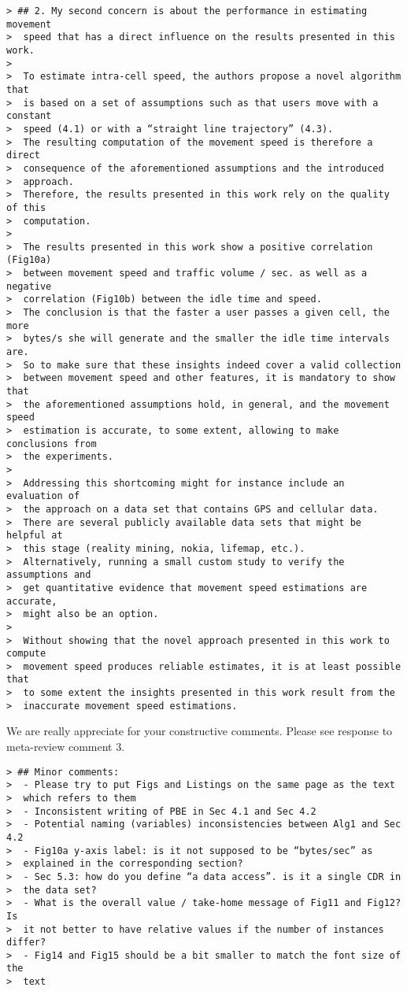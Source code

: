 \begin{verbatim}
> ## 2. My second concern is about the performance in estimating movement
>  speed that has a direct influence on the results presented in this work.
>
>  To estimate intra-cell speed, the authors propose a novel algorithm that
>  is based on a set of assumptions such as that users move with a constant
>  speed (4.1) or with a “straight line trajectory” (4.3).
>  The resulting computation of the movement speed is therefore a direct
>  consequence of the aforementioned assumptions and the introduced
>  approach.
>  Therefore, the results presented in this work rely on the quality of this
>  computation.
>
>  The results presented in this work show a positive correlation (Fig10a)
>  between movement speed and traffic volume / sec. as well as a negative
>  correlation (Fig10b) between the idle time and speed.
>  The conclusion is that the faster a user passes a given cell, the more
>  bytes/s she will generate and the smaller the idle time intervals are.
>  So to make sure that these insights indeed cover a valid collection
>  between movement speed and other features, it is mandatory to show that
>  the aforementioned assumptions hold, in general, and the movement speed
>  estimation is accurate, to some extent, allowing to make conclusions from
>  the experiments.
>
>  Addressing this shortcoming might for instance include an evaluation of
>  the approach on a data set that contains GPS and cellular data.
>  There are several publicly available data sets that might be helpful at
>  this stage (reality mining, nokia, lifemap, etc.).
>  Alternatively, running a small custom study to verify the assumptions and
>  get quantitative evidence that movement speed estimations are accurate,
>  might also be an option.
>
>  Without showing that the novel approach presented in this work to compute
>  movement speed produces reliable estimates, it is at least possible that
>  to some extent the insights presented in this work result from the
>  inaccurate movement speed estimations.
\end{verbatim}

We are really appreciate for your constructive comments.
Please see response to meta-review comment 3.

\begin{verbatim}
> ## Minor comments:
>  - Please try to put Figs and Listings on the same page as the text
>  which refers to them
>  - Inconsistent writing of PBE in Sec 4.1 and Sec 4.2
>  - Potential naming (variables) inconsistencies between Alg1 and Sec 4.2
>  - Fig10a y-axis label: is it not supposed to be “bytes/sec” as
>  explained in the corresponding section?
>  - Sec 5.3: how do you define “a data access”. is it a single CDR in
>  the data set?
>  - What is the overall value / take-home message of Fig11 and Fig12? Is
>  it not better to have relative values if the number of instances differ?
>  - Fig14 and Fig15 should be a bit smaller to match the font size of the
>  text
\end{verbatim}

